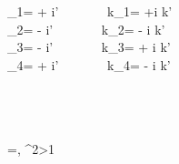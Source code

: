 
\\\\
{\omega_1}=  + \frac {\beta}{\left | \beta \right |} \sqrt {}i\omega'
 \ \ \ \ \ \ \ 
{k_1}= +\frac {\beta}{\left | \beta \right |}\sqrt {}i k'
\\
{\omega_2}=  - \frac {\beta}{\left | \beta \right |} \sqrt {}i\omega'
 \ \ \ \ \ \ \
{k_2}= - \frac {\beta}{\left | \beta \right |}\sqrt \frac{\beta+1}{\beta-1}i k'
\\
{\omega_3}=  - \frac {\beta}{\left | \beta \right |} \sqrt {}i\omega'
 \ \ \ \ \ \ \ 
{k_3}= + \frac {\beta}{\left | \beta \right |}\sqrt {}i k'
\\
{\omega_4}=  + \frac {\beta}{\left | \beta \right |} \sqrt {}i\omega'
 \ \ \ \ \ \ \
{k_4}= - \frac {\beta}{\left | \beta \right |}\sqrt {}i k'



\\\\
\\
\beta=, \beta^2\textgreater 1

